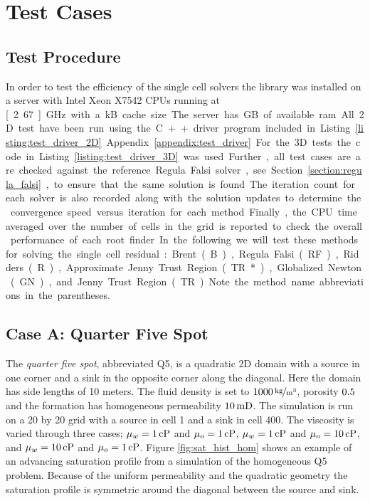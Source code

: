 \section{Test Cases}
\label{section:test_cases}
\subsection{Test Procedure}
\label{section:test_procedure}
In order to test the efficiency of the single cell solvers the \opm library was installed on a server with Intel\textregistered{}  Xeon\textregistered{}  X7542 CPUs running at \unit[2.67]{GHz} with a \unit[18432]{kB} cache size. The server has \unit[252]{GB} of available ram. All 2D test have been run using the C++ driver program included in Listing \ref{listing:test_driver_2D} Appendix \ref{appendix:test_driver}. For the 3D tests the code in Listing \ref{listing:test_driver_3D} was used. Further, all test cases are are checked against the reference Regula Falsi solver, see Section \ref{section:regula_falsi}, to ensure that the same solution is found. The iteration count for each solver is also recorded along with the solution updates to determine the  convergence speed versus iteration for each method. Finally, the CPU time averaged over the number of cells in the grid is reported to check the overall performance of each root finder. In the following we will test these methods for solving the single cell residual: Brent (B), Regula Falsi (RF), Ridders (R), Approximate Jenny Trust Region (TR*),  Globalized Newton (GN), and Jenny Trust Region (TR). Note the method name abbreviations in the parentheses.


\subsection{Case A: Quarter Five Spot}
\label{section:caseA}
The \emph{quarter five spot}, abbreviated Q5, is a quadratic 2D domain with a source in one corner and a sink in the opposite corner along the diagonal. Here the domain has side lengths of 10 meters. The fluid density is set to $\unitfrac[1000]{kg}{m^3}$, porosity $\unit[0.5]{}$ and the formation has homogeneous permeability $\unit[10]{mD}$. The simulation is run on a 20 by 20 grid with a source in cell 1 and a sink in cell 400. The viscosity is varied through three cases; $\mu_w = \unit[1]{cP}$ and $\mu_o= \unit[1]{cP}$, $\mu_w = \unit[1]{cP}$ and $\mu_o= \unit[10]{cP}$, and $\mu_w = \unit[10]{cP}$ and $\mu_o= \unit[1]{cP}$. Figure \ref{fig:sat_hist_hom} shows an example of an advancing saturation profile from a simulation of the homogeneous Q5 problem. Because of the uniform permeability and the quadratic geometry the saturation profile is symmetric around the diagonal between the source and sink.

